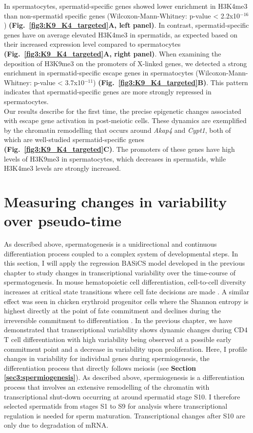 In spermatocytes, spermatid-specific genes showed lower enrichment in H3K4me3 than non-spermatid specific genes (Wilcoxon-Mann-Whitney: p-value < 2.2x10$^{-16}$) \textbf{(Fig.~\ref{fig3:K9_K4_targeted}A, left panel)}. In contrast, spermatid-specific genes have on average elevated H3K4me3 in spermatids, as expected based on their increased expression level compared to spermatocytes \textbf{(Fig.~\ref{fig3:K9_K4_targeted}A, right panel)}. When examining the deposition of H3K9me3 on the promoters of X-linked genes, we detected a strong enrichment in spermatid-specific escape genes in spermatocytes (Wilcoxon-Mann-Whitney: p-value < 3.7x10$^{-11}$) \textbf{(Fig.~\ref{fig3:K9_K4_targeted}B)}. This pattern indicates that spermatid-specific genes are more strongly repressed in spermatocytes. \\

Our results describe for the first time, the precise epigenetic changes associated with escape gene activation in post-meiotic cells. These dynamics are exemplified by the chromatin remodelling that occurs around \textit{Akap4} and \textit{Cypt1}, both of which are well-studied spermatid-specific genes \textbf{(Fig.~\ref{fig3:K9_K4_targeted}C)}. The promoters of these genes have high levels of H3K9me3 in spermatocytes, which decreases in spermatids, while H3K4me3 levels are strongly increased. 

\section{Measuring changes in variability over pseudo-time}

As described above, spermatogenesis is a unidirectional and continuous differentiation process coupled to a complex system of developmental steps. In this section, I will apply the regression BASiCS model developed in the previous chapter to study changes in transcriptional variability over the time-course of spermatogenesis. In mouse hematopoietic cell differentiation,  cell-to-cell diversity increases at critical state transitions where cell fate decisions are made \citep{Mojtahedi2016}. A similar effect was seen in chicken erythroid progenitor cells where the Shannon entropy is highest directly at the point of fate commitment and declines during the irreversible commitment to differentiation \cite{Richard2016}. In the previous chapter, we have demonstrated that transcriptional variability shows dynamic changes during CD4\plus{} T cell differentiation with high variability being observed at a possible early commitment point and a decrease in variability upon proliferation. Here, I profile changes in variability for individual genes during spermiogenesis, the differentiation process that directly follows meiosis (see \textbf{Section \ref{sec3:spermiogenesis}}). As described above, spermiogenesis is a differentiation process that involves an extensive remodelling of the chromatin with transcriptional shut-down occurring at around spermatid stage S10. I therefore selected spermatids from stages S1 to S9 for analysis where transcriptional regulation is needed for sperm maturation. Transcriptional changes after S10 are only due to degradation of mRNA. 

